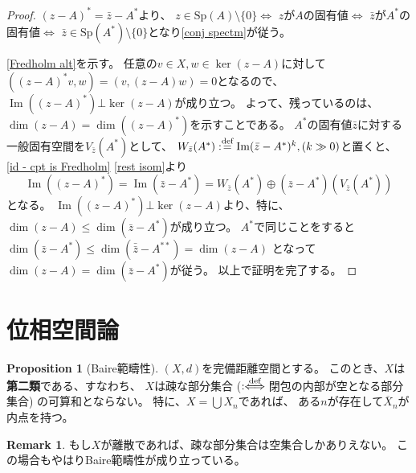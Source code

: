 \documentclass[uplatex]{jsarticle}
\theoremstyle{definition}
\newtheorem{prop}[prop]{Proposition}
\newtheorem{rem}[rem]{Remark}
\DeclareMathOperator{\im}{\mathrm{Im}}
\newcommand{\dfn}{:\overset{\mbox{{\scriptsize def}}}{=}}
\newcommand{\deff}{:\hspace{-3pt}\overset{\text{def}}{\iff}}
\newcommand{\spectm}{\mathrm{Sp}}
\begin{document}
\begin{proof}
  \((z-A)^* = \bar{z} - A^*\)より、
  \(z\in \spectm(A)\setminus \{0\}\)\(\iff\)
  \(z\)が\(A\)の固有値\(\iff\)
  \(\bar{z}\)が\(A^*\)の固有値\(\iff\)
  \(\bar{z}\in \spectm(A^*)\setminus \{0\}\)となり\ref{conj spectm}が従う。

  \ref{Fredholm alt}を示す。
  任意の\(v\in X,w\in \ker(z-A)\)に対して
  \(((z-A)^*v,w) = (v,(z-A)w) = 0\)となるので、
  \(\im((z-A)^*)\bot \ker(z-A)\)が成り立つ。
  よって、残っているのは、\(\dim(z-A)=\dim((z-A)^*)\)を示すことである。
  \(A^*\)の固有値\(\bar{z}\)に対する一般固有空間を\(V_{\bar{z}}(A^*)\)として、
  \(W_{\bar{z}}(A^*)\dfn \im(\bar{z}-A^*)^k, (k\gg 0)\)と置くと、
  \autoref{id - cpt is Fredholm} \ref{rest isom}より
  \[\im((z-A)^*) = \im(\bar{z}-A^*) = W_{\bar{z}}(A^*) \oplus (\bar{z}-A^*)(V_{\bar{z}}(A^*))\]
  となる。
  \(\im((z-A)^*)\bot\ker(z-A)\)より、特に、
  \(\dim(z-A)\leq \dim(\bar{z}-A^*)\)が成り立つ。
  \(A^*\)で同じことをすると
  \(\dim(\bar{z}-A^*)\leq \dim(\bar{\bar{z}}-A^{**}) = \dim(z-A)\)
  となって\(\dim(z-A)=\dim(\bar{z}-A^*)\)が従う。
  以上で証明を完了する。
\end{proof}





\appendix


\section{位相空間論}



\begin{prop}[Baire範疇性]
  \label{Baire category}
  \((X,d)\)を完備距離空間とする。
  このとき、\(X\)は\textbf{第二類}である、すなわち、
  \(X\)は疎な部分集合 (\(\deff\)閉包の内部が空となる部分集合)
  の可算和とならない。
  特に、\(X = \bigcup X_n\)であれば、
  ある\(n\)が存在して\(\overline{X}_n\)が内点を持つ。
\end{prop}

\begin{rem}
  もし\(X\)が離散であれば、疎な部分集合は空集合しかありえない。
  この場合もやはりBaire範疇性が成り立っている。
\end{rem}
\end{document}
